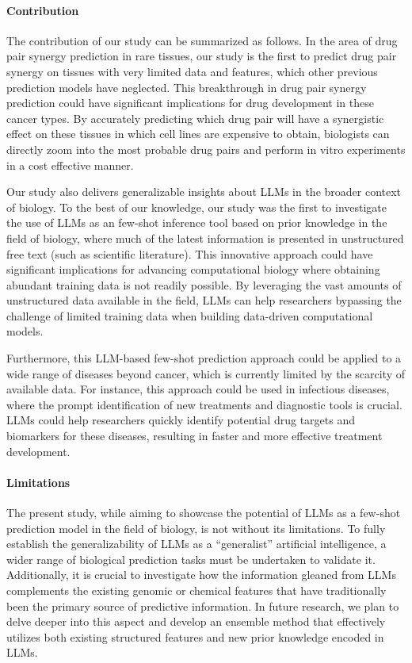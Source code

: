 {\paragraph{Contribution}
The contribution of our study can be summarized as follows. In the area of drug pair synergy prediction in rare tissues, our study is the first to predict drug pair synergy on tissues with very limited data and features, which other previous prediction models have neglected. This breakthrough in drug pair synergy prediction could have significant implications for drug development in these cancer types. By accurately predicting which drug pair will have a synergistic effect on these tissues in which cell lines are expensive to obtain, biologists can directly zoom into the most probable drug pairs and perform in vitro experiments in a cost effective manner. 

Our study also delivers generalizable insights about LLMs in the broader context of  biology. To the best of our knowledge, our study was the first to investigate the use of LLMs as an few-shot inference tool based on prior knowledge in the field of biology, where much of the latest information is presented in unstructured free text (such as scientific literature). This innovative approach could have significant implications for advancing computational biology where obtaining abundant training data is not readily possible. By leveraging the vast amounts of unstructured data available in the field, LLMs can help researchers bypassing the challenge of limited training data when building data-driven computational models. 

Furthermore, this LLM-based few-shot prediction approach could be applied to a wide range of diseases beyond cancer, which is currently limited by the scarcity of available data. For instance, this approach could be used in infectious diseases, where the prompt identification of new treatments and diagnostic tools is crucial. LLMs could help researchers quickly identify potential drug targets and biomarkers for these diseases, resulting in faster and more effective treatment development. 


\paragraph{Limitations}
The present study, while aiming to showcase the potential of LLMs as a few-shot prediction model in the field of biology, is not without its limitations. To fully establish the generalizability of LLMs as a ``generalist'' artificial intelligence, a wider range of biological prediction tasks must be undertaken to validate it. Additionally, it is crucial to investigate how the information gleaned from LLMs complements the existing genomic or chemical features that have traditionally been the primary source of predictive information. In future research, we plan to delve deeper into this aspect and develop an ensemble method that effectively utilizes both existing structured features and new prior knowledge encoded in LLMs. 

}
